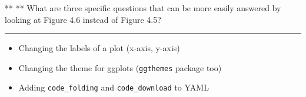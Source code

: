 \documentclass[]{tufte-book}
\providecommand{\tightlist}{%
  \setlength{\itemsep}{0pt}\setlength{\parskip}{0pt}}
\begin{document}
** ** What are three specific questions that can be more easily answered
by looking at Figure 4.6 instead of Figure 4.5?

\begin{center}\rule{0.5\linewidth}{\linethickness}\end{center}

\begin{itemize}
\tightlist
\item
  Changing the labels of a plot (x-axis, y-axis)
\item
  Changing the theme for ggplots (\texttt{ggthemes} package too)
\item
  Adding \texttt{code\_folding} and \texttt{code\_download} to YAML
\end{itemize}


\end{document}
